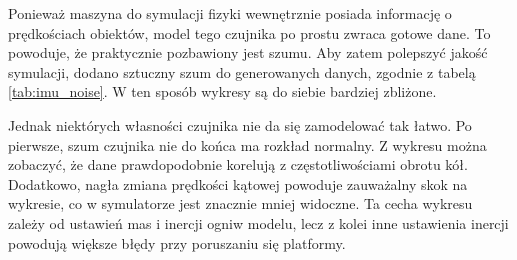 		Ponieważ maszyna do symulacji fizyki wewnętrznie posiada informację o prędkościach obiektów, model tego czujnika po prostu zwraca gotowe dane. 
		To powoduje, że praktycznie pozbawiony jest szumu. 
		Aby zatem polepszyć jakość symulacji, dodano sztuczny szum do generowanych danych, zgodnie z tabelą \ref{tab:imu_noise}.
		W ten sposób wykresy są do siebie bardziej zbliżone.
		
		Jednak niektórych własności czujnika nie da się zamodelować tak łatwo. Po pierwsze, szum czujnika nie do końca ma rozkład normalny.
		Z wykresu można zobaczyć, że dane prawdopodobnie korelują z częstotliwościami obrotu kół.
		Dodatkowo, nagła zmiana prędkości kątowej powoduje zauważalny skok na wykresie, co w symulatorze jest znacznie mniej widoczne.
		Ta cecha wykresu zależy od ustawień mas i inercji ogniw modelu, lecz z kolei inne ustawienia inercji powodują większe błędy przy poruszaniu się platformy.
		
		
		
	
	
